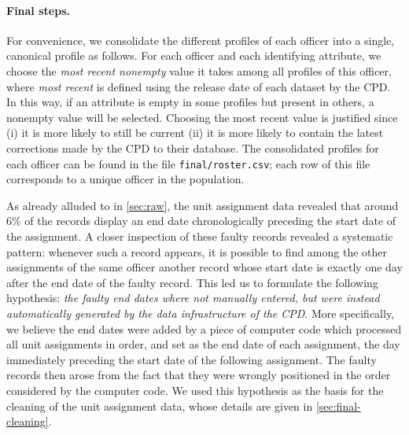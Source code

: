 \paragraph{Final steps.} For convenience, we consolidate the
different profiles of each officer into a single, canonical profile as follows.
For each officer and each identifying attribute, we choose the \emph{most recent
nonempty} value it takes among all profiles of this officer, where \emph{most
recent} is defined using the release date of each dataset by the CPD. In this way,
if an attribute is empty in some profiles but present in others, a nonempty value
will be selected. Choosing the most recent value is justified since (i) it is
more likely to still be current (ii) it is more likely to contain the latest
corrections made by the CPD to their database. The consolidated profiles
for each officer can be found in the file \texttt{final/roster.csv};
each row of this file corresponds to a unique officer in the population. 

As already alluded to in \cref{sec:raw}, the unit assignment data revealed that
around 6\% of the records display an end date chronologically preceding the
start date of the assignment. A closer inspection of these faulty records
revealed a systematic pattern: whenever such a record appears, it is possible
to find among the other assignments of the same officer another record whose
start date is exactly one day after the end date of the faulty record. This led
us to formulate the following hypothesis: \emph{the faulty end dates where not
manually entered, but were instead automatically generated by the data
infrastructure of the CPD}.  More specifically, we believe the end dates were
added by a piece of computer code which processed all unit assignments in
order, and set as the end date of each assignment, the day immediately
preceding the start date of the following assignment. The faulty records then
arose from the fact that they were wrongly positioned in the order considered
by the computer code. We used this hypothesis as the basis for the cleaning of the unit assignment data, whose details are given in \cref{sec:final-cleaning}.


